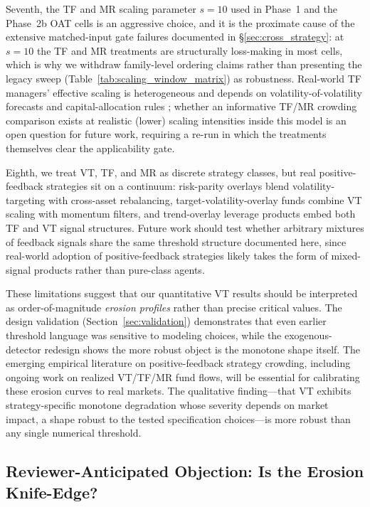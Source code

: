 \documentclass[12pt,a4paper]{article}
\begin{document}
Seventh, the TF and MR scaling parameter $s = 10$ used in Phase~1 and the Phase~2b OAT cells is an aggressive choice, and it is the proximate cause of the extensive matched-input gate failures documented in \S\ref{sec:cross_strategy}: at $s = 10$ the TF and MR treatments are structurally loss-making in most cells, which is why we withdraw family-level ordering claims rather than presenting the legacy sweep (Table~\ref{tab:scaling_window_matrix}) as robustness. Real-world TF managers' effective scaling is heterogeneous and depends on volatility-of-volatility forecasts and capital-allocation rules \citep{moskowitz2012}; whether an informative TF/MR crowding comparison exists at realistic (lower) scaling intensities inside this model is an open question for future work, requiring a re-run in which the treatments themselves clear the applicability gate.

Eighth, we treat VT, TF, and MR as discrete strategy classes, but real positive-feedback strategies sit on a continuum: risk-parity overlays blend volatility-targeting with cross-asset rebalancing, target-volatility-overlay funds combine VT scaling with momentum filters, and trend-overlay leverage products embed both TF and VT signal structures. Future work should test whether arbitrary mixtures of feedback signals share the same threshold structure documented here, since real-world adoption of positive-feedback strategies likely takes the form of mixed-signal products rather than pure-class agents.

These limitations suggest that our quantitative VT results should be interpreted as order-of-magnitude \emph{erosion profiles} rather than precise critical values. The design validation (Section~\ref{sec:validation}) demonstrates that even earlier threshold language was sensitive to modeling choices, while the exogenous-detector redesign shows the more robust object is the monotone shape itself. The emerging empirical literature on positive-feedback strategy crowding, including ongoing work on realized VT/TF/MR fund flows, will be essential for calibrating these erosion curves to real markets. The qualitative finding---that VT exhibits strategy-specific monotone degradation whose severity depends on market impact, a shape robust to the tested specification choices---is more robust than any single numerical threshold.

\subsection{Reviewer-Anticipated Objection: Is the Erosion Knife-Edge?}
\label{sec:knife_edge_rebuttal}
\end{document}

